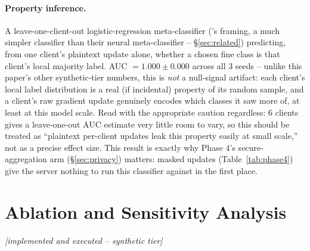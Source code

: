 \documentclass[11pt]{article}
\newcommand{\status}[1]{\textit{[#1]}}
\begin{document}
\paragraph{Property inference.} A leave-one-client-out logistic-regression
meta-classifier (\citet{melis2019exploiting}'s framing, a much simpler
classifier than their neural meta-classifier -- \S\ref{sec:related})
predicting, from one client's plaintext update alone, whether a chosen
fine class is that client's local majority label. AUC $= 1.000 \pm 0.000$
across all 3 seeds -- unlike this paper's other synthetic-tier numbers,
this is \emph{not} a null-signal artifact: each client's local label
distribution is a real (if incidental) property of its random sample, and
a client's raw gradient update genuinely encodes which classes it saw more
of, at least at this model scale. Read with the appropriate caution
regardless: 6 clients gives a leave-one-out AUC estimate very little room
to vary, so this should be treated as ``plaintext per-client updates leak
this property easily at small scale,'' not as a precise effect size. This
result is exactly why Phase 4's secure-aggregation arm
(\S\ref{sec:privacy}) matters: masked updates (Table~\ref{tab:phase4})
give the server nothing to run this classifier against in the first
place.

\section{Ablation and Sensitivity Analysis}
\label{sec:ablation}
\status{implemented and executed -- synthetic tier}
\end{document}
